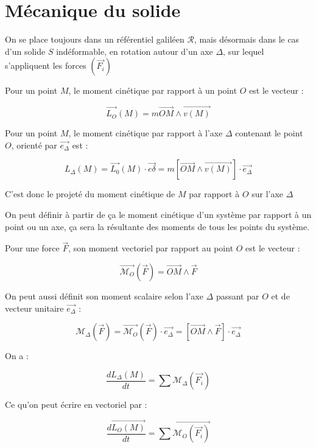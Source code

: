 \documentclass[a4paper,12pt]{book}
\newcommand{\Def}[2]{\begin{tcolorbox}[colback=white,colframe=red!10!green!20!blue!75!, title=Définition : #1]#2\end{tcolorbox}}
\newcommand{\Thr}[2]{\begin{tcolorbox}[sharp corners, colback=white,colframe=red!10!blue!30!green!75!, title=Théorème : #1]#2\end{tcolorbox}}
\renewcommand{\Vec}[1]{\overrightarrow{#1}}
\begin{document}
\section{Mécanique du solide}
On se place toujours dans un référentiel galiléen $\mathcal{R}$, mais désormais dans le cas d'un solide $S$ indéformable, en rotation autour d'un axe $\Delta$, sur lequel s'appliquent les forces $(\Vec{F_i})$
\Def{Moment cinétique}{Pour un point $M$, le moment cinétique par rapport à un point $O$ est le vecteur :
\par $$\Vec{L_O}(M) = m\Vec{OM}\wedge\Vec{v(M)}$$
\par Pour un point $M$, le moment cinétique par rapport à l'axe $\Delta$ contenant le point $O$, orienté par $\Vec{e_\Delta}$ est :
\par $$L_\Delta(M)=\Vec{L_0}(M)\cdot\Vec{e\delta} = m[\Vec{OM}\wedge\Vec{v(M)}]\cdot\Vec{e_\Delta}$$
\par C'est donc le projeté du moment cinétique de $M$ par rapport à $O$ sur l'axe $\Delta$
\par On peut définir à partir de ça le moment cinétique d'un système par rapport à un point ou un axe, ça sera la résultante des moments de tous les points du système.}
\Def{Moment d'une force}{Pour une force $\Vec{F}$, son moment vectoriel par rapport au point $O$ est le vecteur :
\par $$\Vec{\mathcal{M}_O}(\Vec{F}) = \Vec{OM}\wedge \Vec{F}$$
\par On peut aussi définit son moment scalaire selon l'axe $\Delta$ passant par $O$ et de vecteur unitaire $\Vec{e_\Delta}$ :
\par $$\mathcal{M}_\Delta(\Vec{F}) = \Vec{\mathcal{M}_O}(\Vec{F})\cdot\Vec{e_\Delta} = [\Vec{OM}\wedge\Vec{F}]\cdot\Vec{e_\Delta}$$}
\Thr{Théorème du moment cinétique}{On a :
\par $$\dfrac{dL_\Delta(M)}{dt} = \sum\mathcal{M}_\Delta(\Vec{F_i})$$
\par Ce qu'on peut écrire en vectoriel par :
\par $$\dfrac{d\Vec{L_O(M)}}{dt} = \sum\Vec{\mathcal{M}_O(\Vec{F_i})}$$}
\end{document}
